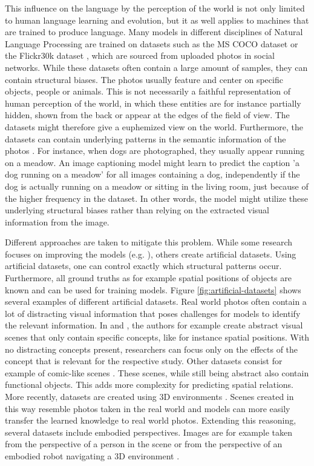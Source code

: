 This influence on the language by the perception of the world is not only limited to human language learning and evolution, but it as well applies to machines that are trained to produce language.
Many models in different disciplines of Natural Language Processing are trained on datasets such as the MS COCO dataset \citep{Lin2014} or the Flickr30k dataset \citep{Young2014}, which are sourced from uploaded photos in social networks.
While these datasets often contain a large amount of samples, they can contain structural biases.
The photos usually feature and center on specific objects, people or animals.
This is not necessarily a faithful representation of human perception of the world, in which these entities are for instance partially hidden, shown from the back or appear at the edges of the field of view.
The datasets might therefore give a euphemized view on the world.
Furthermore, the datasets can contain underlying patterns in the semantic information of the photos \citep{Hendricks2018,Johnson2017a,Hudson2019}.
For instance, when dogs are photographed, they usually appear running on a meadow.
An image captioning model might learn to predict the caption 'a dog running on a meadow' for all images containing a dog, independently if the dog is actually running on a meadow or sitting in the living room, just because of the higher frequency in the dataset.
In other words, the model might utilize these underlying structural biases rather than relying on the extracted visual information from the image.

Different approaches are taken to mitigate this problem.
While some research focuses on improving the models (e.g. \citet{Hendricks2018,Lu2017}), others create artificial datasets.
Using artificial datasets, one can control exactly which structural patterns occur.
Furthermore, all ground truths as for example spatial positions of objects are known and can be used for training models.
Figure \ref{fig:artificial-datasets} shows several examples of different artificial datasets.
Real world photos often contain a lot of distracting visual information that poses challenges for models to identify the relevant information.
In \citep{Ghanimifard2017} and \citep{Ji2022}, the authors for example create abstract visual scenes that only contain specific concepts, like for instance spatial positions.
With no distracting concepts present, researchers can focus only on the effects of the concept that is relevant for the respective study.
Other datasets consist for example of comic-like scenes \citep{Zitnick2013,Zhang2016}.
These scenes, while still being abstract also contain functional objects.
This adds more complexity for predicting spatial relations.
More recently, datasets are created using 3D environments \citep{Johnson2017a,Lee2022,Ahrens2022}.
Scenes created in this way resemble photos taken in the real world and models can more easily transfer the learned knowledge to real world photos.
Extending this reasoning, several datasets include embodied perspectives.
Images are for example taken from the perspective of a person in the scene \citep{Dobnik2015} or from the perspective of an embodied robot navigating a 3D environment \citep{Hill2021}.

